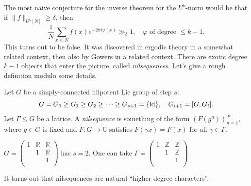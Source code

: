 \documentclass[reqno]{amsart} 
\numberwithin{theorem}{section}
\numberwithin{equation}{section}
\begin{document}
The most naive conjecture for the inverse theorem for the $U^k$-norm would be that if $\lVert f \rVert_{U^k[N]} \geq \delta$, then
\begin{equation*}
  \frac{1}{N}
  \sum_{x \leq N}
  f(x) e^{- 2 \pi i \varphi(x)} \gg_\delta 1,
  \quad
  \varphi \text{ of degree } \leq k - 1.
\end{equation*}
This turns out to be false.  It was discovered in ergodic theory in a somewhat related context, then also by Gowers in a related context.  There are exotic degree $k - 1$ objects that enter the picture, called \emph{nilsequences}.  Let's give a rough definition modulo some details.
\begin{definition}
  Let $G$ be a simply-connected nilpotent Lie group of step $s$:
  \begin{equation*}
    G = G_0 \geq G_1 \geq G_2 \geq \dotsb \geq G_{s + 1} = \{\operatorname{id}\},
    \quad
    G_{i + 1} =[G, G_i].
  \end{equation*}
  Let $\Gamma \leq G$ be a lattice.  A \emph{nilsequence} is something of the form $(F(g^n))_{n = 1}^\infty$, where $g \in G$ is fixed and $F : G \rightarrow \mathbb{C}$ satisfies $F(\gamma x) = F(x)$ for all $\gamma \in \Gamma$.
\end{definition}
\begin{example}
  $G =
  \begin{pmatrix}
    1    & \mathbb{R} & \mathbb{R} \\
         & 1 & \mathbb{R} \\
         &  & 1 \\
  \end{pmatrix}$ has $s = 2$.  One can take $\Gamma =
  \begin{pmatrix}
    1    & \mathbb{Z} & \mathbb{Z} \\
         & 1 & \mathbb{Z} \\
         &  & 1 \\
  \end{pmatrix}$.
\end{example}
It turns out that nilsequences are natural ``higher-degree characters''.
\end{document}
